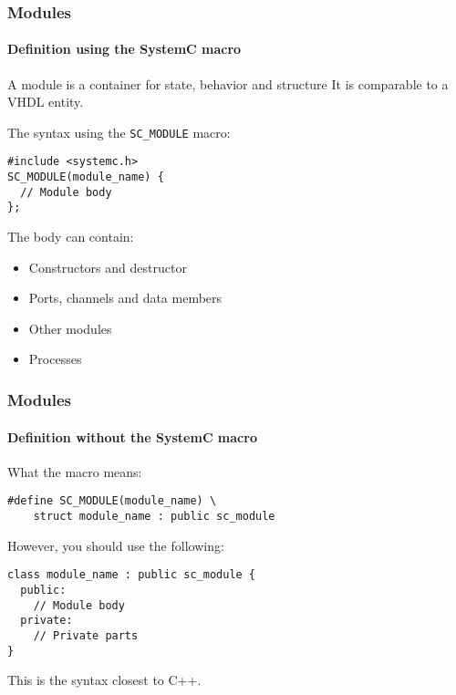 \begin{frame}[fragile]
\frametitle{Modules}
\framesubtitle{Definition using the SystemC macro}

\begin{block}{A module is a container for state, behavior and structure}
It is comparable to a VHDL entity.
\end{block}
\pause
\begin{block}{The syntax using the \texttt{SC\_MODULE} macro:}
\vspace{-1em}
\begin{verbatim}
#include <systemc.h>
SC_MODULE(module_name) {
  // Module body
};
\end{verbatim}
\vspace{-1em}
\end{block}
\pause
\begin{block}{The body can contain:}
\vspace{-0.5em}
\begin{itemize}
\item Constructors and destructor
\item Ports, channels and data members
\item Other modules
\item Processes
\end{itemize}
\vspace{-0.5em}
\end{block}
\end{frame}

\begin{frame}[fragile]
\frametitle{Modules}
\framesubtitle{Definition without the SystemC macro}

\begin{block}{What the macro means:}
\vspace{-1em}
\begin{verbatim}
#define SC_MODULE(module_name) \
    struct module_name : public sc_module
\end{verbatim}
\vspace{-1em}
\end{block}
\pause
\begin{block}{However, you should use the following:}
\vspace{-1em}
\begin{verbatim}
class module_name : public sc_module {
  public:
    // Module body
  private:
    // Private parts
}
\end{verbatim}
This is the syntax closest to C++.
\end{block}
\end{frame}